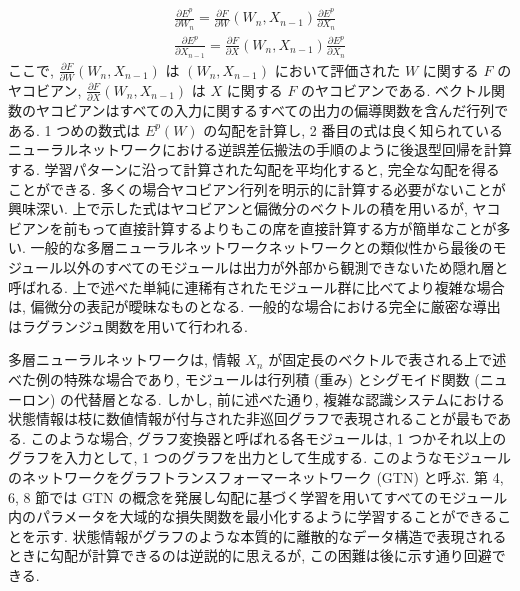 \documentclass[twocolumn]{jarticle}     %
\begin{document}
\begin{eqnarray}
  \frac{\partial E^p}{\partial W_n} = \frac{\partial F}{\partial W} (W_n , X_{n-1}) \frac{\partial E^p}{\partial X_n}  \nonumber \\ 
  \frac{\partial E^p}{\partial X_{n-1}} = \frac{\partial F}{\partial X} (W_n , X_{n-1}) \frac{\partial E^p}{\partial X_n} 
\end{eqnarray}
ここで, $\frac{\partial F}{\partial W} (W_n , X_{n-1})$ は $(W_n , X_{n-1})$ において評価された $W$ に関する $F$ のヤコビアン, $\frac{\partial F}{\partial X} (W_n , X_{n-1})$ は $X$ に関する $F$ のヤコビアンである. ベクトル関数のヤコビアンはすべての入力に関するすべての出力の偏導関数を含んだ行列である. 1 つめの数式は $E^p (W)$ の勾配を計算し, 2 番目の式は良く知られているニューラルネットワークにおける逆誤差伝搬法の手順のように後退型回帰を計算する. 学習パターンに沿って計算された勾配を平均化すると, 完全な勾配を得ることができる.
多くの場合ヤコビアン行列を明示的に計算する必要がないことが興味深い. 上で示した式はヤコビアンと偏微分のベクトルの積を用いるが, ヤコビアンを前もって直接計算するよりもこの席を直接計算する方が簡単なことが多い. 一般的な多層ニューラルネットワークネットワークとの類似性から最後のモジュール以外のすべてのモジュールは出力が外部から観測できないため隠れ層と呼ばれる. 上で述べた単純に連稀有されたモジュール群に比べてより複雑な場合は, 偏微分の表記が曖昧なものとなる. 一般的な場合における完全に厳密な導出はラグランジュ関数を用いて行われる.
\par
多層ニューラルネットワークは, 情報 $X_n$ が固定長のベクトルで表される上で述べた例の特殊な場合であり, モジュールは行列積 (重み) とシグモイド関数 (ニューロン) の代替層となる. しかし, 前に述べた通り, 複雑な認識システムにおける状態情報は枝に数値情報が付与された非巡回グラフで表現されることが最もである. このような場合, グラフ変換器と呼ばれる各モジュールは, 1 つかそれ以上のグラフを入力として, 1 つのグラフを出力として生成する. このようなモジュールのネットワークをグラフトランスフォーマーネットワーク (GTN) と呼ぶ. 第 4, 6, 8 節では GTN の概念を発展し勾配に基づく学習を用いてすべてのモジュール内のパラメータを大域的な損失関数を最小化するように学習することができることを示す. 状態情報がグラフのような本質的に離散的なデータ構造で表現されるときに勾配が計算できるのは逆説的に思えるが, この困難は後に示す通り回避できる.
\end{document}
